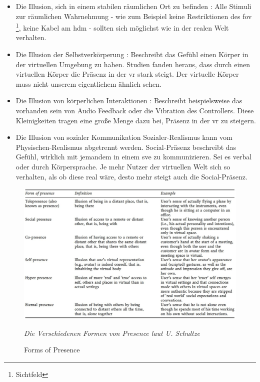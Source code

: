 \documentclass[a4paper,11pt]{article}%
\renewcommand{\\}{\vspace*{0.5\baselineskip} \newline}
\begin{document}
\begin{itemize}
	\item{Die Illusion, sich in einem stabilen räumlichen Ort zu befinden} : Alle Stimuli zur räumlichen Wahrnehmung - wie zum Beispiel keine Restriktionen des \ac{fov} \footnote{Sichtfeld}, keine Kabel am \ac{hdm} - sollten sich möglichst wie in der realen Welt verhalten. \citep[p.47]{jerald2015vr}
	\item{Die Illusion der Selbstverkörperung} : Beschreibt das Gefühl einen Körper in der virtuellen Umgebung zu haben. Studien fanden heraus, dass durch einen virtuellen Körper die Präsenz in der \ac{vr} stark steigt. \citep[p.756]{botvinick1998rubber} Der virtuelle Körper muss nicht unserem eigentlichem ähnlich sehen. \citep[p.7]{maxwell1960psycho}
	\item{Die Illusion von körperlichen Interaktionen} : Beschreibt beispielsweise das vorhanden sein von Audio Feedback oder die Vibration des Controllers. Diese Kleinigkeiten tragen eine große Menge dazu bei, Präsenz in der \ac{vr} zu steigern. \citep[p.48]{jerald2015vr}
	\item{Die Illusion von sozialer Kommunikation} Sozialer-Realismus kann vom Physischen-Realismus abgetrennt werden. Social-Präsenz beschreibt das Gefühl, wirklich mit jemandem in einem \ac{sve} zu kommunizieren. Sei es verbal oder durch Körpersprache. Je mehr Nutzer der virtuellen Welt sich so verhalten, als ob diese real wäre, desto mehr steigt auch die Social-Präsenz. \citep[p.49]{jerald2015vr} \citep[p.12]{guadagno2007virtual}
\end{itemize}

\begin{figure}[H]
		\begin{footnotesize}
		\centering
			\includegraphics[scale= 0.4]{Abbildungen/forms_presence.JPG}
			\caption[Abbildung 1]{Forms of Presence}
			\textit{Die Verschiedenen Formen von Presence laut U.  Schultze \citep{schultze2010embodiment} }
			\label{vertical_horizontal}
		\end{footnotesize}
	\end{figure}
\end{document}
